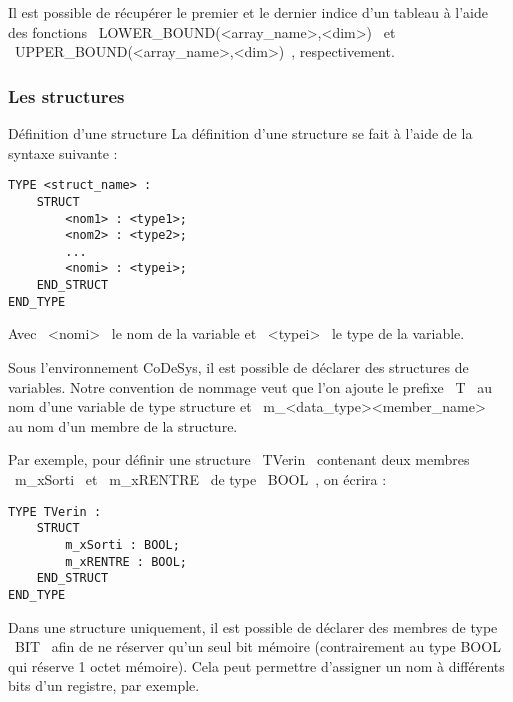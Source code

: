 Il est possible de récupérer le premier et le dernier indice d'un tableau à l'aide des fonctions ~LOWER_BOUND(<array_name>,<dim>)~ et ~UPPER_BOUND(<array_name>,<dim>)~, respectivement.


\subsubsection{Les structures}
\begin{UPSTIinfor}{Définition d'une structure}
    La définition d'une structure se fait à l'aide de la syntaxe suivante : 
    \begin{lstlisting}[language=ST]
TYPE <struct_name> :
    STRUCT
        <nom1> : <type1>;
        <nom2> : <type2>;
        ...
        <nomi> : <typei>;
    END_STRUCT
END_TYPE\end{lstlisting}

    Avec ~<nomi>~ le nom de la variable et ~<typei>~ le type de la variable. 
\end{UPSTIinfor}
Sous l'environnement CoDeSys, il est possible de déclarer des structures de variables. 
Notre convention de nommage veut que l'on ajoute le prefixe ~T~ au nom d'une variable de type structure et ~m_<data_type><member_name>~ au nom d'un membre de la structure.

Par exemple, pour définir une structure ~TVerin~ contenant deux membres ~m_xSorti~ et ~m_xRENTRE~ de type ~BOOL~, on écrira : 
\begin{lstlisting}[language=ST]
TYPE TVerin :
    STRUCT
        m_xSorti : BOOL;
        m_xRENTRE : BOOL;
    END_STRUCT
END_TYPE\end{lstlisting}

Dans une structure uniquement, il est possible de déclarer des membres de type ~BIT~ afin de ne réserver qu'un seul bit mémoire (contrairement au type BOOL qui réserve 1 octet mémoire). Cela peut permettre d'assigner un nom à différents bits d'un registre, par exemple. 


